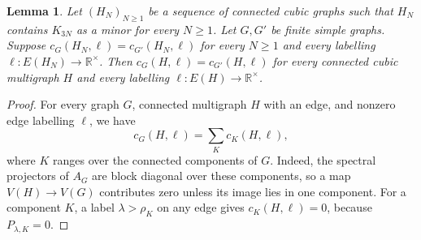 \documentclass[10pt,a4paper]{article}
\theoremstyle{plain}
\newtheorem{lemma}[theorem]{Lemma}
\theoremstyle{definition}
\newcommand{\R}{\mathbb{R}}
\begin{document}
\begin{lemma}\label{lem:cubic-coefficient-transfer}
 Let $(H_N)_{N\geq1}$ be a sequence of connected cubic graphs such that
 $H_N$ contains $K_{3N}$ as a minor for every $N\geq1$.
 Let $G,G'$ be finite simple graphs. Suppose
 $c_G(H_N,\ell)=c_{G'}(H_N,\ell)$ for every $N\geq1$ and every
 labelling $\ell:E(H_N)\to\R^\times$.
 Then $c_G(H,\ell)=c_{G'}(H,\ell)$ for every connected cubic
 multigraph $H$ and every labelling $\ell:E(H)\to\R^\times$.
\end{lemma}
\begin{proof}
For every graph $G$, connected multigraph $H$ with an edge, and nonzero
edge labelling $\ell$, we have
\begin{equation}\label{eq:component-contributions}
 c_G(H,\ell)=\sum_K c_K(H,\ell),
\end{equation}
where $K$ ranges over the connected components of $G$.
Indeed, the spectral projectors of $A_G$ are block diagonal over these
components, so a map $V(H)\to V(G)$ contributes zero unless its image
lies in one component.
For a component $K$, a label $\lambda>\rho_K$ on any edge gives
$c_K(H,\ell)=0$, because $P_{\lambda,K}=0$.


\end{proof}
\end{document}
